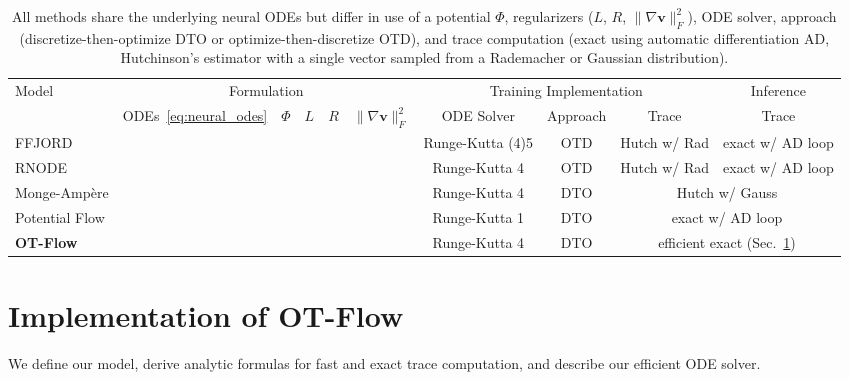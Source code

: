 \documentclass[letterpaper]{article}
\newcommand{\bfv}{\mathbf{v}}
\newcommand{\model}{OT-Flow} %
\newcommand{\cmark}{\textcolor{mygreen}{\ding{51}}}
\newcommand{\xmark}{\textcolor{myred}{\ding{55}}}
\begin{document}
\begin{table*}[t]
\centering
\renewcommand{\arraystretch}{1.1}
\addtolength{\tabcolsep}{-1pt} %
\begin{tabular}{lccccccccc}
	\toprule
	\multirow{2}{*}{\vspace{-5pt}Model} &  \multicolumn{5}{c}{Formulation} & \multicolumn{3}{c}{Training Implementation } & Inference\\
	\cmidrule(lr){2-6} \cmidrule(lr){7-9} \cmidrule(lr){10-10}
 & ODEs~\eqref{eq:neural_odes} & $\Phi$ & $L$ & $R$ & $\| \nabla \bfv \|_F^2$ & ODE Solver & Approach & Trace & Trace\\
	\midrule
	FFJORD 				& \cmark & \xmark & \xmark & \xmark & \xmark & Runge-Kutta (4)5  & OTD & Hutch w/ Rad & exact w/ AD loop\\
	RNODE 				&\cmark & \xmark & \cmark & \xmark & \cmark & Runge-Kutta 4 & OTD & Hutch w/ Rad & exact w/ AD loop\\
	Monge-Ampère	&\cmark & \cmark & \xmark & \xmark & \xmark & Runge-Kutta 4 & DTO & \multicolumn{2}{c}{Hutch w/ Gauss}\\
	Potential Flow &\cmark & \cmark & \xmark & \cmark & \xmark & Runge-Kutta 1 & DTO & \multicolumn{2}{c}{exact w/ AD loop}\\
	\textbf{\model{}} 	& \cmark & \cmark & \cmark & \cmark & \xmark & Runge-Kutta 4 & DTO & \multicolumn{2}{c}{efficient exact (Sec.~\ref{sec:trace})}\\
	\bottomrule
\end{tabular}
\addtolength{\tabcolsep}{1pt} %
\caption{All methods share the underlying neural ODEs but differ in use of a potential $\Phi$, regularizers ($L$, $R$, $\| \nabla \bfv \|_F^2$), ODE solver, approach (discretize-then-optimize DTO or optimize-then-discretize OTD), and trace computation (exact using automatic differentiation AD, Hutchinson's estimator with a single vector sampled from a Rademacher or Gaussian distribution).}
\label{tab:comparison}
\end{table*}


\section{Implementation of \model{}} 
\label{sec:trace}

We define our model, derive analytic formulas for fast and exact trace computation, and describe our efficient ODE solver.
\end{document}
